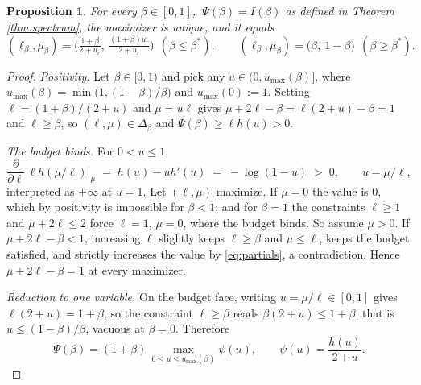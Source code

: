\documentclass[10pt,a4paper]{amsart}
\newtheorem{proposition}{Proposition}
\begin{document}
\begin{proposition}\label{prop:variational}
For every $\beta\in[0,1]$, $\ \Psi(\beta)=I(\beta)$ as defined in Theorem \ref{thm:spectrum}, the maximizer is unique, and it equals
\[
(\ell_\beta,\mu_\beta)=
\Big(\tfrac{1+\beta}{2+u_r},\ \tfrac{(1+\beta)u_r}{2+u_r}\Big)\ \ (\beta\le\beta^{*}),
\qquad
(\ell_\beta,\mu_\beta)=\big(\beta,\ 1-\beta\big)\ \ (\beta\ge\beta^{*}).
\]
\end{proposition}

\begin{proof}
\emph{Positivity.} Let $\beta\in[0,1)$ and pick any $u\in(0,u_{\max}(\beta)]$, where $u_{\max}(\beta)=\min\big(1,(1-\beta)/\beta\big)$ and $u_{\max}(0):=1$. Setting $\ell=(1+\beta)/(2+u)$ and $\mu=u\ell$ gives $\mu+2\ell-\beta=\ell(2+u)-\beta=1$ and $\ell\ge\beta$, so $(\ell,\mu)\in \Delta_\beta$ and $\Psi(\beta)\ge\ell h(u)>0$.

\emph{The budget binds.} For $0<u\le1$,
\begin{equation}\label{eq:partials}
\frac{\partial}{\partial\ell}\,\ell h(\mu/\ell)\Big|_{\mu}\;=\;h(u)-u h'(u)\;=\;-\log(1-u)\;>\;0,
\qquad u=\mu/\ell ,
\end{equation}
interpreted as $+\infty$ at $u=1$. Let $(\ell,\mu)$ maximize. If $\mu=0$ the value is $0$, which by positivity is impossible for $\beta<1$; and for $\beta=1$ the constraints $\ell\ge1$ and $\mu+2\ell\le2$ force $\ell=1$, $\mu=0$, where the budget binds. So assume $\mu>0$. If $\mu+2\ell-\beta<1$, increasing $\ell$ slightly keeps $\ell\ge\beta$ and $\mu\le\ell$, keeps the budget satisfied, and strictly increases the value by \eqref{eq:partials}, a contradiction. Hence $\mu+2\ell-\beta=1$ at every maximizer.

\emph{Reduction to one variable.} On the budget face, writing $u=\mu/\ell\in[0,1]$ gives $\ell(2+u)=1+\beta$, so the constraint $\ell\ge\beta$ reads $\beta(2+u)\le1+\beta$, that is $u\le(1-\beta)/\beta$, vacuous at $\beta=0$. Therefore
\[
\Psi(\beta)=(1+\beta)\,\max_{0\le u\le u_{\max}(\beta)}\psi(u),
\qquad
\psi(u)=\frac{h(u)}{2+u}.
\]


\end{proof}
\end{document}
